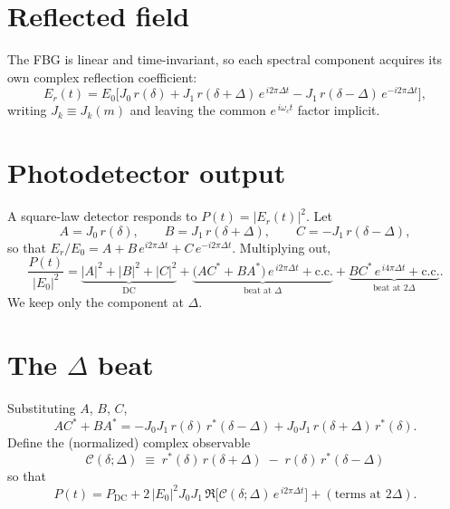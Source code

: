 \documentclass[aps,pra, onecolumn,superscriptaddress,nopacs,floatfix, showkeys, notitlepage]{revtex4-1}
\begin{document}
\section{Reflected field}

The FBG is linear and time-invariant, so each spectral component acquires
its own complex reflection coefficient:
\begin{equation}
    E_r(t) = E_0\Big[
    J_0\, r(\delta)
    + J_1\, r(\delta+\Delta)\, e^{\,i 2\pi \Delta t}
    - J_1\, r(\delta-\Delta)\, e^{-i 2\pi \Delta t}
    \Big],
\end{equation}
writing $J_k \equiv J_k(m)$ and leaving the common $e^{\,i\omega_c t}$
factor implicit.

\section{Photodetector output}

A square-law detector responds to $P(t) = |E_r(t)|^2$. Let
\begin{equation}
    A = J_0\, r(\delta), \qquad
    B = J_1\, r(\delta+\Delta), \qquad
    C = -J_1\, r(\delta-\Delta),
\end{equation}
so that $E_r / E_0 = A + B\, e^{i 2\pi\Delta t} + C\, e^{-i 2\pi\Delta t}$.
Multiplying out,
\begin{equation}
    \frac{P(t)}{|E_0|^2}
    = \underbrace{|A|^2 + |B|^2 + |C|^2}_{\text{DC}}
    + \underbrace{\big(A C^* + B A^*\big)\, e^{\,i 2\pi \Delta t}
                 + \mathrm{c.c.}}_{\text{beat at } \Delta}
    + \underbrace{B C^*\, e^{\,i 4\pi \Delta t} + \mathrm{c.c.}}_{\text{beat at } 2\Delta}.
\end{equation}
We keep only the component at $\Delta$.

\section{The $\Delta$ beat}

Substituting $A$, $B$, $C$,
\begin{equation}
    A C^* + B A^*
    = -J_0 J_1\, r(\delta)\, r^*(\delta-\Delta)
      + J_0 J_1\, r(\delta+\Delta)\, r^*(\delta).
\end{equation}
Define the (normalized) complex observable
\begin{equation}
    \boxed{\;
    \mathcal{C}(\delta;\Delta)
    \;\equiv\; r^*(\delta)\,r(\delta+\Delta) \;-\; r(\delta)\,r^*(\delta-\Delta)
    \;}
\end{equation}
so that
\begin{equation}
    P(t) = P_{\mathrm{DC}} + 2\,|E_0|^2 J_0 J_1 \,
    \Re\!\big[\mathcal{C}(\delta;\Delta)\, e^{\,i 2\pi \Delta t}\big]
    + (\text{terms at } 2\Delta).
\end{equation}
\end{document}
